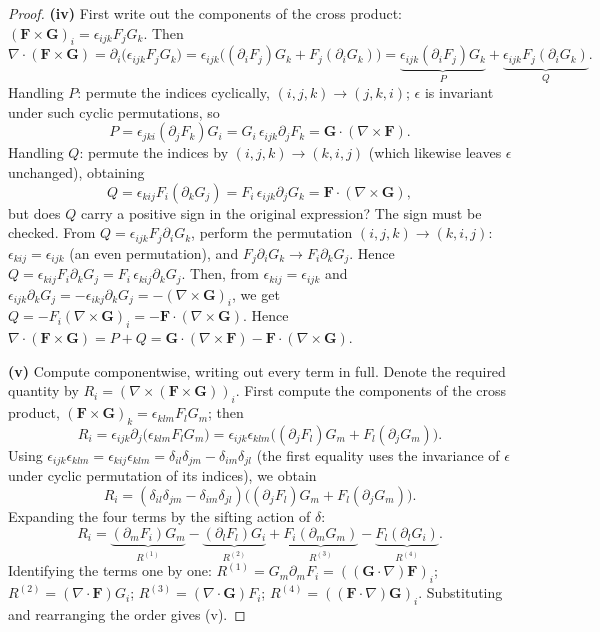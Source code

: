 \begin{proof}
\textbf{(iv)} First write out the components of the cross product: $(\mathbf F\times\mathbf G)_i = \epsilon_{ijk}F_jG_k$. Then
\[
\nabla\cdot(\mathbf F\times\mathbf G) = \partial_i\bigl(\epsilon_{ijk}F_jG_k\bigr)
= \epsilon_{ijk}\bigl((\partial_iF_j)G_k + F_j(\partial_iG_k)\bigr)
= \underbrace{\epsilon_{ijk}(\partial_iF_j)G_k}_{P} + \underbrace{\epsilon_{ijk}F_j(\partial_iG_k)}_{Q}.
\]
Handling $P$: permute the indices cyclically, $(i,j,k)\to(j,k,i)$; $\epsilon$ is invariant under such cyclic permutations, so
\[
P = \epsilon_{jki}(\partial_jF_k)G_i = G_i\,\epsilon_{ijk}\partial_jF_k = \mathbf G\cdot(\nabla\times\mathbf F).
\]
Handling $Q$: permute the indices by $(i,j,k)\to(k,i,j)$ (which likewise leaves $\epsilon$ unchanged), obtaining
\[
Q = \epsilon_{kij}F_i(\partial_kG_j) = F_i\,\epsilon_{ijk}\partial_jG_k = \mathbf F\cdot(\nabla\times\mathbf G),
\]
but does $Q$ carry a positive sign in the original expression? The sign must be checked. From $Q=\epsilon_{ijk}F_j\partial_iG_k$, perform the permutation $(i,j,k)\to(k,i,j)$: $\epsilon_{kij}=\epsilon_{ijk}$ (an even permutation), and $F_j\partial_iG_k \to F_i\partial_kG_j$. Hence $Q=\epsilon_{kij}F_i\partial_kG_j = F_i\,\epsilon_{kij}\partial_kG_j$. Then, from $\epsilon_{kij}=\epsilon_{ijk}$ and $\epsilon_{ijk}\partial_kG_j = -\epsilon_{ikj}\partial_kG_j = -(\nabla\times\mathbf G)_i$, we get $Q = -F_i(\nabla\times\mathbf G)_i = -\mathbf F\cdot(\nabla\times\mathbf G)$. Hence $\nabla\cdot(\mathbf F\times\mathbf G) = P+Q = \mathbf G\cdot(\nabla\times\mathbf F)-\mathbf F\cdot(\nabla\times\mathbf G)$.

\textbf{(v)} Compute componentwise, writing out every term in full. Denote the required quantity by $R_i = (\nabla\times(\mathbf F\times\mathbf G))_i$. First compute the components of the cross product, $(\mathbf F\times\mathbf G)_k = \epsilon_{klm}F_lG_m$; then
\[
R_i = \epsilon_{ijk}\partial_j\bigl(\epsilon_{klm}F_lG_m\bigr)
= \epsilon_{ijk}\epsilon_{klm}\bigl((\partial_jF_l)G_m + F_l(\partial_jG_m)\bigr).
\]
Using $\epsilon_{ijk}\epsilon_{klm} = \epsilon_{kij}\epsilon_{klm} = \delta_{il}\delta_{jm}-\delta_{im}\delta_{jl}$ (the first equality uses the invariance of $\epsilon$ under cyclic permutation of its indices), we obtain
\[
R_i = (\delta_{il}\delta_{jm}-\delta_{im}\delta_{jl})\bigl((\partial_jF_l)G_m + F_l(\partial_jG_m)\bigr).
\]
Expanding the four terms by the sifting action of $\delta$:
\[
R_i = \underbrace{(\partial_mF_i)G_m}_{R^{(1)}} - \underbrace{(\partial_lF_l)G_i}_{R^{(2)}} + \underbrace{F_i(\partial_mG_m)}_{R^{(3)}} - \underbrace{F_l(\partial_lG_i)}_{R^{(4)}} .
\]
Identifying the terms one by one: $R^{(1)}=G_m\partial_mF_i = ((\mathbf G\cdot\nabla)\mathbf F)_i$; $R^{(2)}=(\nabla\cdot\mathbf F)G_i$; $R^{(3)}=(\nabla\cdot\mathbf G)F_i$; $R^{(4)}=((\mathbf F\cdot\nabla)\mathbf G)_i$. Substituting and rearranging the order gives (v).


\end{proof}
